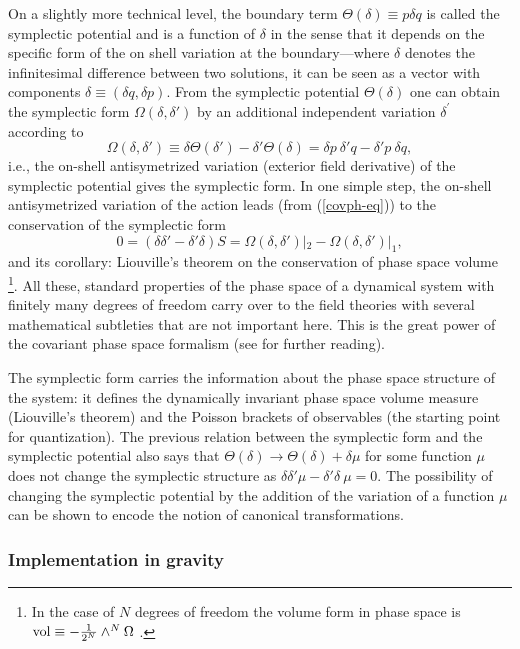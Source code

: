 \documentclass[aps, nofootinbib,superscriptaddress,12pt]{revtex4-2}
\def\be{\begin{equation}}
\def\ee{\end{equation}}
\begin{document}
On a slightly more technical level, the boundary term $\Theta(\delta) \equiv p\delta q$ is called the symplectic potential and is a function of $\delta$ in the sense that it depends on the specific form of the on shell variation at the boundary---where $\delta$ denotes the infinitesimal difference between two solutions, it can be seen as a vector with components $\delta\equiv(\delta q, \delta p)$. From the symplectic potential $\Theta(\delta)$ one can obtain the symplectic form $\Omega(\delta, \delta')$ by an additional independent variation $\delta^\prime$ according to 
\be\label{ome}
\Omega(\delta, \delta')\equiv \delta \Theta(\delta')-\delta' \Theta(\delta)=\delta p\ \delta' \! q-\delta'\!p\ \delta q,
\ee   
i.e., the on-shell antisymetrized variation (exterior field derivative) of the symplectic potential gives the symplectic form. 
In one simple step, the on-shell antisymetrized variation of the action leads (from (\ref{covph-eq})) to the conservation of the symplectic form
\be\label{liv}
0=(\delta\delta'-\delta'\delta)S=\Omega(\delta, \delta')|_2-\Omega(\delta, \delta')|_1,
\ee
and its corollary: Liouville's theorem on the conservation of phase space volume \footnote{In the case of $N$ degrees of freedom the volume form in phase space is ${\rm vol}\equiv -\frac{1}{2^{N}} \wedge^N \Omega$ .}.
All these, standard properties of the phase space of a dynamical system with finitely many degrees of freedom 
carry over to the field theories with several mathematical subtleties that are not important here. This is the great power of the covariant phase space formalism (see \cite{Ashtekar:1990gc, Crnkovic:1986ex, Lee:1990nz} for further reading).


The symplectic form carries the information about the phase space structure of the system: it defines the dynamically invariant phase space volume measure (Liouville's theorem) and the Poisson brackets of observables (the starting point for quantization). The previous relation between the symplectic form and the symplectic potential also says that $\Theta(\delta)\to \Theta(\delta)+\delta \mu$ for some function $\mu$ does not change the symplectic structure as $\delta\delta'\mu-\delta'\!\delta\ \mu=0$. The possibility of changing the symplectic potential by the addition of the variation of a function $\mu$ can be shown to encode the notion of canonical transformations. 

\subsubsection{Implementation in gravity}
 
\end{document}
